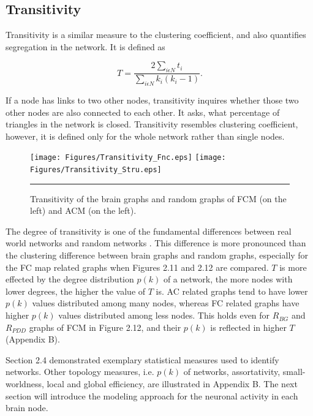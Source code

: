 \subsection{Transitivity}

Transitivity is a similar measure to the clustering coefficient, and also quantifies segregation in the network. It is defined as \citep{NEW03}
	
\begin{equation}
 T = \frac{2\sum\limits_{i \epsilon N}  t_i}{\sum\limits_{i \epsilon N}k_i (k_i - 1)} .
\end{equation}	

If a node has links to two other nodes, transitivity inquires whether those two other nodes are also connected to each other. It asks, what percentage of triangles in the network is closed. Transitivity resembles clustering coefficient, however, it is defined only for the whole network rather than single nodes. 

\begin{figure}[htbp]
  \centering
	\texttt{[image: Figures/Transitivity\_Fnc.eps]}
	\texttt{[image: Figures/Transitivity\_Stru.eps]} 
    \rule{35em}{0.5pt}
    \caption[Transitivity]{Transitivity of the brain graphs and random graphs of FCM (on the left) and ACM (on the left). }
  \label{fig:Transitivity}
\end{figure}


The degree of transitivity is one of the fundamental differences between real world networks and random networks \citep{NEW10}. This difference is more pronounced than the clustering difference between brain graphs and random graphs, especially for the FC map related graphs when Figures 2.11 and 2.12 are compared. $T$ is more effected by the degree distribution $p(k)$ of a network, the more nodes with lower degrees, the higher the value of $T$ is. AC related graphs tend to have lower $p(k)$ values distributed among many nodes, whereas FC related graphs have higher $p(k)$ values distributed among less nodes. This holds even for $R_{BG}$ and $R_{PDD}$ graphs of FCM in Figure 2.12, and their $p(k)$ is reflected in higher $T$ (Appendix B).

Section 2.4 demonstrated exemplary statistical measures used to identify networks. Other topology measures, i.e. $p(k)$ of networks, assortativity, small-worldness, local and global efficiency, are illustrated in Appendix B. The next section will introduce the modeling approach for the neuronal activity in each brain node.   




